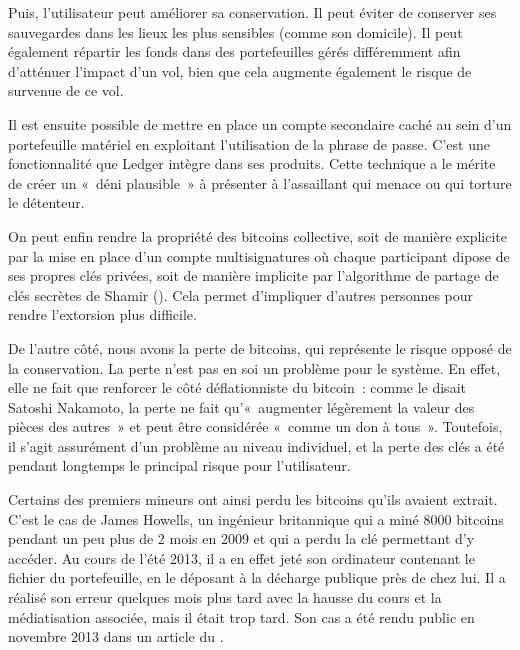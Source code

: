 Puis, l'utilisateur peut améliorer sa conservation. Il peut éviter de conserver ses sauvegardes dans les lieux les plus sensibles (comme son domicile). Il peut également répartir les fonds dans des portefeuilles gérés différemment afin d'atténuer l'impact d'un vol, bien que cela augmente également le risque de survenue de ce vol.

Il est ensuite possible de mettre en place un compte secondaire caché au sein d'un portefeuille matériel en exploitant l'utilisation de la phrase de passe. C'est une fonctionnalité que Ledger intègre dans ses produits. Cette technique a le mérite de créer un «~déni plausible~» à présenter à l'assaillant qui menace ou qui torture le détenteur.

On peut enfin rendre la propriété des bitcoins collective, soit de manière explicite par la mise en place d'un compte multisignatures où chaque participant dipose de ses propres clés privées, soit de manière implicite par l'algorithme de partage de clés secrètes de Shamir (). Cela permet d'impliquer d'autres personnes pour rendre l'extorsion plus difficile. 

De l'autre côté, nous avons la perte de bitcoins, qui représente le risque opposé de la conservation. La perte n'est pas en soi un problème pour le système. En effet, elle ne fait que renforcer le côté déflationniste du bitcoin~: comme le disait Satoshi Nakamoto, la perte ne fait qu'«~augmenter légèrement la valeur des pièces des autres~» et peut être considérée «~comme un don à tous~». Toutefois, il s'agit assurément d'un problème au niveau individuel, et la perte des clés a été pendant longtemps le principal risque pour l'utilisateur.

Certains des premiers mineurs ont ainsi perdu les bitcoins qu'ils avaient extrait. C'est le cas de James Howells, un ingénieur britannique qui a miné 8000 bitcoins pendant un peu plus de 2 mois en 2009 et qui a perdu la clé permettant d'y accéder. Au cours de l'été 2013, il a en effet jeté son ordinateur contenant le fichier du portefeuille, en le déposant à la décharge publique près de chez lui. Il a réalisé son erreur quelques mois plus tard avec la hausse du cours et la médiatisation associée, mais il était trop tard. Son cas a été rendu public en novembre 2013 dans un article du .

